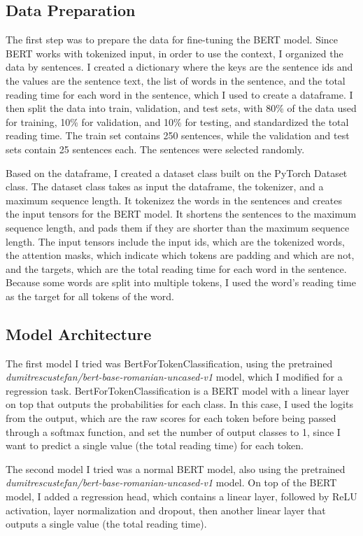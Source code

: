\subsection{Data Preparation}
The first step was to prepare the data for fine-tuning the BERT model. Since BERT works with tokenized input, in order to use the context, I organized the data by sentences. I created a dictionary where the keys are the sentence ids and the values are the sentence text, the list of words in the sentence, and the total reading time for each word in the sentence, which I used to create a dataframe. I then split the data into train, validation, and test sets, with 80\% of the data used for training, 10\% for validation, and 10\% for testing, and standardized the total reading time. The train set contains 250 sentences, while the validation and test sets contain 25 sentences each. The sentences were selected randomly.

Based on the dataframe, I created a dataset class built on the PyTorch Dataset class. The dataset class takes as input the dataframe, the tokenizer, and a maximum sequence length. It tokenizez the words in the sentences and creates the input tensors for the BERT model. It shortens the sentences to the maximum sequence length, and pads them if they are shorter than the maximum sequence length. The input tensors include the input ids, which are the tokenized words, the attention masks, which indicate which tokens are padding and which are not, and the targets, which are the total reading time for each word in the sentence. Because some words are split into multiple tokens, I used the word's reading time as the target for all tokens of the word.

\subsection{Model Architecture}
The first model I tried was BertForTokenClassification, using the pretrained \textit{dumitrescustefan/bert-base-romanian-uncased-v1} model, which I modified for a regression task. BertForTokenClassification is a BERT model with a linear layer on top that outputs the probabilities for each class. In this case, I used the logits from the output, which are the raw scores for each token before being passed through a softmax function, and set the number of output classes to 1, since I want to predict a single value (the total reading time) for each token. 

The second model I tried was a normal BERT model, also using the pretrained \textit{dumitrescustefan/bert-base-romanian-uncased-v1} model. On top of the BERT model, I added a regression head, which contains a linear layer, followed by ReLU activation, layer normalization and dropout, then another linear layer that outputs a single value (the total reading time). 

